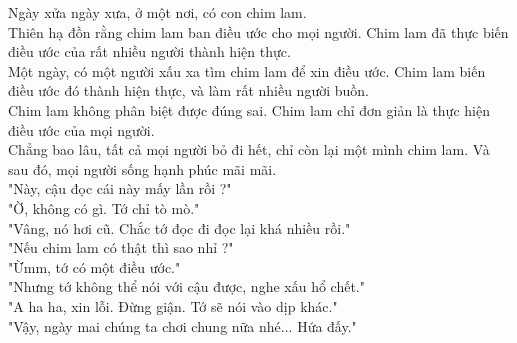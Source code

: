 
Ngày xửa ngày xưa, ở một nơi, có con chim lam. \\

Thiên hạ đồn rằng chim lam ban điều ước cho mọi người. Chim lam đã thực biến điều ước của rất nhiều người thành hiện thực. \\

Một ngày, có một người xấu xa tìm chim lam để xin điều ước. Chim lam biến điều ước đó thành hiện thực, và làm rất nhiều người buồn. \\

Chim lam không phân biệt được đúng sai. Chim lam chỉ đơn giản là thực hiện điều ước của mọi người. \\

Chẳng bao lâu, tất cả mọi người bỏ đi hết, chỉ còn lại một mình chim lam. Và sau đó, mọi người sống hạnh phúc mãi mãi. \\

"Này, cậu đọc cái này mấy lần rồi ?"\\

"Ờ, không có gì. Tớ chỉ tò mò."\\

"Vâng, nó hơi cũ. Chắc tớ đọc đi đọc lại khá nhiều rồi."\\

"Nếu chim lam có thật thì sao nhỉ ?"\\

"Ừmm, tớ có một điều ước."\\

"Nhưng tớ không thể nói với cậu được, nghe xấu hổ chết."\\

"A ha ha, xin lỗi. Đừng giận. Tớ sẽ nói vào dịp khác."\\

"Vậy, ngày mai chúng ta chơi chung nữa nhé... Hứa đấy."\\




